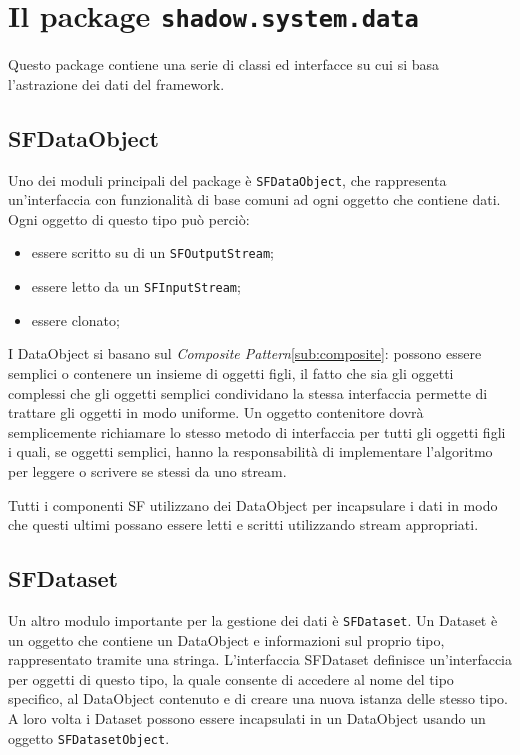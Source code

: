 

\section{Il package \texttt{shadow.system.data}}
\label{sec:shadow_system_data}
Questo package contiene una serie di classi ed interfacce su cui si basa l'astrazione dei dati del framework.

\subsection{SFDataObject}
\label{sub:sfdataobject}
Uno dei moduli principali del package è \texttt{SFDataObject}, che rappresenta un'interfaccia con funzionalità di base comuni ad ogni oggetto che contiene dati. 
Ogni oggetto di questo tipo può perciò:
\begin{itemize}
	\item essere scritto su di un \texttt{SFOutputStream};
	\item essere letto da un \texttt{SFInputStream};
	\item essere clonato;
\end{itemize}
I DataObject si basano sul \textit{Composite Pattern}\ref{sub:composite}: possono essere semplici o contenere un insieme di oggetti figli, il fatto che sia gli oggetti complessi che gli oggetti semplici condividano la stessa interfaccia permette di trattare gli oggetti in modo uniforme. Un oggetto contenitore dovrà semplicemente richiamare lo stesso metodo di interfaccia per tutti gli oggetti figli i quali, se oggetti semplici, hanno la responsabilità di implementare l'algoritmo per leggere o scrivere se stessi da uno stream.

Tutti i componenti SF utilizzano dei DataObject per incapsulare i dati in modo che questi ultimi possano essere letti e scritti utilizzando stream appropriati.

\subsection{SFDataset}
\label{sub:sfdataset}
Un altro modulo importante per la gestione dei dati è \texttt{SFDataset}. Un Dataset è un oggetto che contiene un DataObject e informazioni sul proprio tipo, rappresentato tramite una stringa. 
L'interfaccia SFDataset definisce un'interfaccia per oggetti di questo tipo, la quale consente di accedere al nome del tipo specifico, al DataObject contenuto e di creare una nuova istanza delle stesso tipo.
A loro volta i Dataset possono essere incapsulati in un DataObject usando un oggetto \texttt{SFDatasetObject}.



